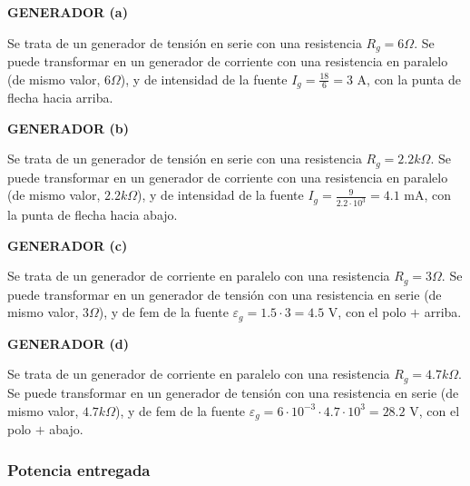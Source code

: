 \documentclass[11pt]{book} %
\begin{document}
\begin{example}
	    \textbf{GENERADOR (a)}
	    
	    Se trata de un generador de tensión en serie con una resistencia $R_g=6\Omega$. Se puede transformar en un generador de corriente con una resistencia en paralelo (de mismo valor, $6\Omega$), y de intensidad de la fuente $I_g=\frac{18}{6}=3$ A, con la punta de flecha hacia arriba.
	    
	    \textbf{GENERADOR (b)}
	    
	    Se trata de un generador de tensión en serie con una resistencia $R_g=2.2k\Omega$. Se puede transformar en un generador de corriente con una resistencia en paralelo (de mismo valor, $2.2k\Omega$), y de intensidad de la fuente $I_g=\frac{9}{2.2\cdot10^3}=4.1$ mA, con la punta de flecha hacia abajo.
	    
	    \textbf{GENERADOR (c)}
	    
	    Se trata de un generador de corriente en paralelo con una resistencia $R_g=3\Omega$. Se puede transformar en un generador de tensión con una resistencia en serie (de mismo valor, $3\Omega$), y de fem de la fuente $\varepsilon_g=1.5\cdot 3=4.5$ V, con el polo $+$ arriba.
	    
	    \textbf{GENERADOR (d)}
	    
	    Se trata de un generador de corriente en paralelo con una resistencia $R_g=4.7k\Omega$. Se puede transformar en un generador de tensión con una resistencia en serie (de mismo valor, $4.7k\Omega$), y de fem de la fuente $\varepsilon_g=6\cdot 10^{-3}\cdot 4.7\cdot 10^3=28.2$ V, con el polo $+$ abajo.
	\end{example}
	
	\subsubsection{Potencia entregada}
	
\end{document}
